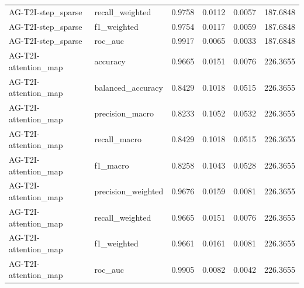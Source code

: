 \begin{tabular}{llrrrr}
AG-T2I-step_sparse & recall_weighted & 0.9758 & 0.0112 & 0.0057 & 187.6848 \\
AG-T2I-step_sparse & f1_weighted & 0.9754 & 0.0117 & 0.0059 & 187.6848 \\
AG-T2I-step_sparse & roc_auc & 0.9917 & 0.0065 & 0.0033 & 187.6848 \\
AG-T2I-attention_map & accuracy & 0.9665 & 0.0151 & 0.0076 & 226.3655 \\
AG-T2I-attention_map & balanced_accuracy & 0.8429 & 0.1018 & 0.0515 & 226.3655 \\
AG-T2I-attention_map & precision_macro & 0.8233 & 0.1052 & 0.0532 & 226.3655 \\
AG-T2I-attention_map & recall_macro & 0.8429 & 0.1018 & 0.0515 & 226.3655 \\
AG-T2I-attention_map & f1_macro & 0.8258 & 0.1043 & 0.0528 & 226.3655 \\
AG-T2I-attention_map & precision_weighted & 0.9676 & 0.0159 & 0.0081 & 226.3655 \\
AG-T2I-attention_map & recall_weighted & 0.9665 & 0.0151 & 0.0076 & 226.3655 \\
AG-T2I-attention_map & f1_weighted & 0.9661 & 0.0161 & 0.0081 & 226.3655 \\
AG-T2I-attention_map & roc_auc & 0.9905 & 0.0082 & 0.0042 & 226.3655 \\
\bottomrule
\end{tabular}
